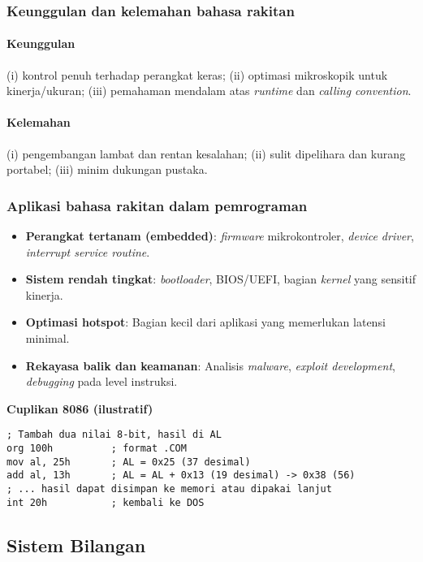 \subsubsection{Keunggulan dan kelemahan bahasa rakitan}
\paragraph{Keunggulan} (i) kontrol penuh terhadap perangkat keras; (ii) optimasi mikroskopik untuk kinerja/ukuran; (iii) pemahaman mendalam atas \textit{runtime} dan \textit{calling convention}.\newline
\paragraph{Kelemahan} (i) pengembangan lambat dan rentan kesalahan; (ii) sulit dipelihara dan kurang portabel; (iii) minim dukungan pustaka.

\subsubsection{Aplikasi bahasa rakitan dalam pemrograman}
\begin{itemize}
  \item \textbf{Perangkat tertanam (embedded)}: \textit{firmware} mikrokontroler, \textit{device driver}, \textit{interrupt service routine}.
  \item \textbf{Sistem rendah tingkat}: \textit{bootloader}, BIOS/UEFI, bagian \textit{kernel} yang sensitif kinerja.
  \item \textbf{Optimasi hotspot}: Bagian kecil dari aplikasi yang memerlukan latensi minimal.
  \item \textbf{Rekayasa balik dan keamanan}: Analisis \textit{malware}, \textit{exploit development}, \textit{debugging} pada level instruksi.
\end{itemize}

\noindent\textbf{Cuplikan 8086 (ilustratif)}
\begin{verbatim}
; Tambah dua nilai 8-bit, hasil di AL
org 100h          ; format .COM
mov al, 25h       ; AL = 0x25 (37 desimal)
add al, 13h       ; AL = AL + 0x13 (19 desimal) -> 0x38 (56)
; ... hasil dapat disimpan ke memori atau dipakai lanjut
int 20h           ; kembali ke DOS
\end{verbatim}

\subsection{Sistem Bilangan}

